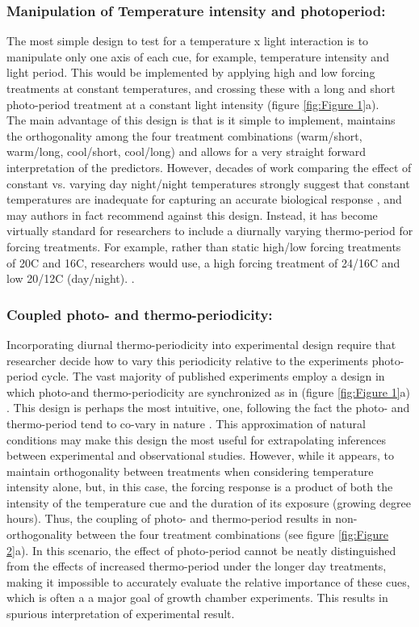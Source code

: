 \documentclass[12pt]{article}\usepackage[]{graphicx}\usepackage[]{color}
\begin{document}
\subsubsection*{Manipulation of Temperature intensity and photoperiod:}
\indent \indent The most simple design to test for a temperature x light interaction is to manipulate only one axis of each cue, for example, temperature intensity and light period. This would be implemented by applying high and low forcing treatments at constant temperatures, and crossing these with a long and short photo-period treatment at a constant light intensity (figure \ref{fig:Figure 1}a).\\
\indent The main advantage of this design is that is it simple to implement, maintains the orthogonality among the four treatment combinations (warm/short, warm/long, cool/short, cool/long) and allows for a very straight forward interpretation of the predictors. However, decades of work comparing the effect of constant vs. varying day night/night temperatures strongly suggest that constant temperatures are inadequate for capturing an accurate biological response \citep{findcitations}, and may authors in fact recommend against this design. Instead, it has become virtually standard for researchers to include a diurnally varying thermo-period for forcing treatments. For example, rather than static high/low forcing treatments of 20\degree C and 16\degree C, researchers would use, a high forcing treatment of 24\degree/16\degree C and low 20\degree/12\degree C (day/night). \citep{Ettinger_inprep}.
\subsubsection*{Coupled photo- and thermo-periodicity:}
\indent\indent Incorporating diurnal thermo-periodicity into experimental design require that researcher decide how to vary this periodicity relative to the experiments photo-period cycle. The vast majority of published experiments employ a design in which photo-and thermo-periodicity are synchronized as in (figure \ref{fig:Figure 1}a) \citep{Ettinger_inprep}. This design is perhaps the most intuitive, one,  following the fact the photo- and thermo-period tend to co-vary in nature \citep{findcitations}. This approximation of natural conditions may make this design the most useful for extrapolating inferences between experimental and observational studies. However, while it appears, to maintain orthogonality between treatments when considering temperature intensity alone, but, in this case, the forcing response is a product of both the intensity of the temperature cue and the duration of its exposure (growing degree hours).  Thus, the coupling of photo- and thermo-period results in non-orthogonality between the four treatment combinations (see figure \ref{fig:Figure 2}a). In this scenario, the effect of photo-period cannot be neatly distinguished from the effects of increased thermo-period under the longer day treatments, making it impossible to accurately evaluate the relative importance of these cues, which is often a a major goal of growth chamber experiments. This results in spurious interpretation of experimental result.
\end{document}
